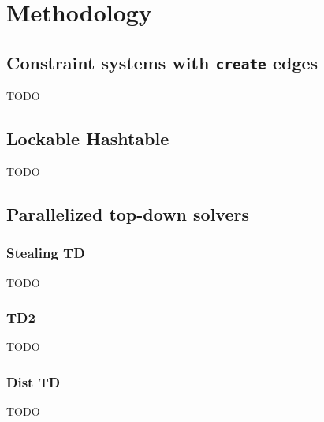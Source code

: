 \section{Methodology}
\label{sec:method}

  \subsection{Constraint systems with \texttt{create} edges}
  \label{sec:method:create}
  TODO

  \subsection{Lockable Hashtable}
  \label{sec:method:LHM}
  TODO

  \subsection{Parallelized top-down solvers}
  \label{sec:method:td_parallel}

    \subsubsection{Stealing TD}
    \label{sec:method:td_parallel:stealing}
    TODO

    \subsubsection{TD2}
    \label{sec:method:td_parallel:base}
    TODO

    \subsubsection{Dist TD}
    \label{sec:method:td_parallel:dist}
    TODO
